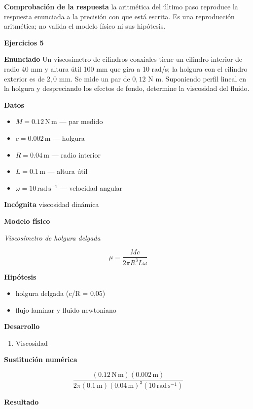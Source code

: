 \documentclass[10pt,openany]{book}
\begin{document}
\noindent\textbf{Comprobación de la respuesta} la aritmética del último paso reproduce la respuesta enunciada a la precisión con que está escrita. Es una reproducción aritmética; no valida el modelo físico ni sus hipótesis.

\noindent\textbf{Ejercicios 5}

\noindent\textbf{Enunciado}
Un viscosímetro de cilindros coaxiales tiene un cilindro interior de radio 40 mm y altura útil 100 mm que gira a 10 rad/s; la holgura con el cilindro exterior es de \(2{,}0\) mm. Se mide un par de \(0{,}12\) N m. Suponiendo perfil lineal en la holgura y despreciando los efectos de fondo, determine la viscosidad del fluido.

\noindent\textbf{Datos}
\begin{itemize}
\item $M = 0.12\,\mathrm{N}\,\mathrm{m}$ — par medido
\item $c = 0.002\,\mathrm{m}$ — holgura
\item $R = 0.04\,\mathrm{m}$ — radio interior
\item $L = 0.1\,\mathrm{m}$ — altura útil
\item $\omega = 10\,\mathrm{rad}\,\mathrm{s}^{-1}$ — velocidad angular
\end{itemize}

\noindent\textbf{Incógnita}
viscosidad dinámica

\noindent\textbf{Modelo físico}

\noindent\textit{Viscosímetro de holgura delgada}

\[
\mu = \frac{M c}{2\pi R^{3} L \omega}
\]

\noindent\textbf{Hipótesis}
\begin{itemize}
\item holgura delgada (c/R = 0,05)
\item flujo laminar y fluido newtoniano
\end{itemize}

\noindent\textbf{Desarrollo}
\begin{enumerate}
\item
Viscosidad
\end{enumerate}

\noindent\textbf{Sustitución numérica}

\[
\frac{\left(0.12\,\mathrm{N}\,\mathrm{m}\right) \left(0.002\,\mathrm{m}\right)}{2 \pi \left(0.1\,\mathrm{m}\right) \left(0.04\,\mathrm{m}\right)^{3} \left(10\,\mathrm{rad}\,\mathrm{s}^{-1}\right)}
\]

\noindent\textbf{Resultado}
\end{document}

